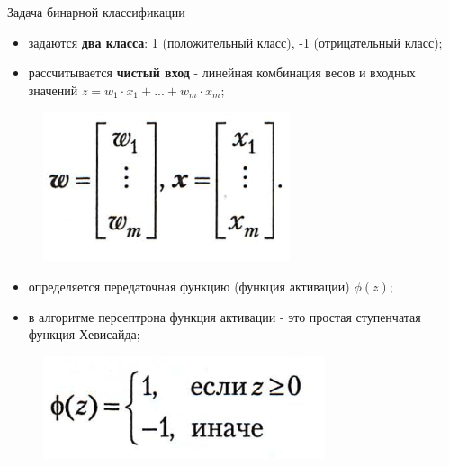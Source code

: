 \documentclass{beamer}
\begin{document}
\begin{frame}[t]{Задача бинарной классификации}
\begin{itemize}
\item задаются \textbf{два класса}: 1 (положительный класс), -1 (отрицательный класс);
\item рассчитывается \textbf{чистый вход} - линейная комбинация весов и входных значений $z=w_1\cdot x_1+...+w_m\cdot x_m$;
\end{itemize}
\begin{figure}[h]
\centering
\includegraphics[scale=0.5]{images/lec03-pic02.png}
\end{figure}
\begin{itemize}
\item определяется передаточная функцию (функция активации) $\phi(z)$;
\item в алгоритме персептрона функция активации - это простая ступенчатая функция Хевисайда;
\end{itemize}
\begin{figure}[h]
\centering
\includegraphics[scale=0.4]{images/lec03-pic03.png}
\end{figure}
\end{frame}
\end{document}
